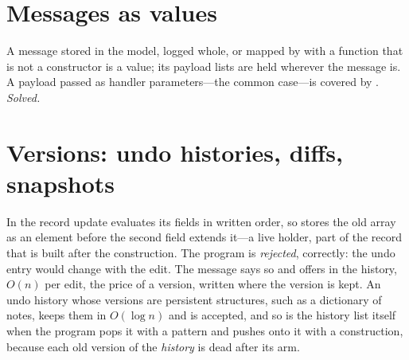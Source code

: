 \section{Messages as values}
\label{sec:hard-messages}

A message stored in the model, logged whole, or mapped by  with a function that is not a
constructor is a value; its payload lists are held wherever the message is. A payload passed as
handler parameters---the common case---is covered by . \emph{Solved.}

\section{Versions: undo histories, diffs, snapshots}
\label{sec:hard-undo}

In  the
record update evaluates its fields in written order, so  stores the old array as an element
before the second field extends it---a live holder, part of the record that is built after the
construction. The program is \emph{rejected}, correctly: the undo entry would change with the edit. The
message says so and offers  in the history, $O(n)$ per edit, the price of a
version, written where the version is kept. An undo history whose versions are persistent structures,
such as a dictionary of notes, keeps them in $O(\log n)$ and is accepted, and so is the history list
itself when the program pops it with a pattern and pushes onto it with a construction, because each old
version of the \emph{history} is dead after its arm.

